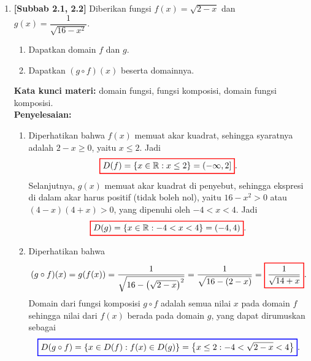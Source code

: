 \documentclass[10pt,openany,a4paper]{article}
\theoremstyle{definition}
\theoremstyle{definition}
\theoremstyle{plain}
\newenvironment{jawab}[2][tes]{%
\par\noindent\textbf{Kata kunci materi:} #1.\\
\textbf{Penyelesaian:} #2%
}{}
\begin{document}
\begin{enumerate}
    \item \textbf{[Subbab 2.1, 2.2]} Diberikan fungsi $f(x)=\sqrt{2-x}$ dan $g(x)=\dfrac{1}{\sqrt{16-x^2}}$.
    \begin{enumerate}
        \item Dapatkan domain $f$ dan $g$.
        \item Dapatkan $(g\circ f)(x)$ beserta domainnya.
    \end{enumerate}
    \begin{jawab}[domain fungsi, fungsi komposisi, domain fungsi komposisi]{
        \begin{enumerate}
            \item Diperhatikan bahwa $f(x)$ memuat akar kuadrat, sehingga syaratnya adalah $2-x\geq 0$, yaitu $x\leq 2$. Jadi
            \begin{align*}
                \colorlet{oldcolor}{.}
        \color{red}
        \setlength{\fboxrule}{1pt} \boxed{\color{oldcolor}D(f)=\{x\in\mathbb{R} : x\leq 2\}=(-\infty,2]}\color{oldcolor}.
            \end{align*}
            Selanjutnya, $g(x)$ memuat akar kuadrat di penyebut, sehingga ekspresi di dalam akar harus positif (tidak boleh nol), yaitu $16-x^2>0$ atau $(4-x)(4+x)>0$, yang dipenuhi oleh $-4<x<4$. Jadi
            \begin{align*}
                \colorlet{oldcolor}{.}
        \color{red}
        \setlength{\fboxrule}{1pt} \boxed{\color{oldcolor}D(g)=\{x\in\mathbb{R} : -4<x<4\}=(-4,4)}\color{oldcolor}.
            \end{align*}
            \item Diperhatikan bahwa
            \begin{align*}
                (g\circ f)(x) = g(f(x)) = \frac{1}{\sqrt{16-\left(\sqrt{2-x}\right)^2}} = \frac{1}{\sqrt{16-(2-x)}} = \colorlet{oldcolor}{.}
        \color{red}
        \setlength{\fboxrule}{1pt} \boxed{\color{oldcolor}\frac{1}{\sqrt{14+x}}}\color{oldcolor}.
            \end{align*}
            Domain dari fungsi komposisi $g\circ f$ adalah semua nilai $x$ pada domain $f$ sehingga nilai dari $f(x)$ berada pada domain $g$, yang dapat dirumuskan sebagai
            \begin{align*}
                \colorlet{oldcolor}{.}
        \color{blue}
        \setlength{\fboxrule}{1pt} \boxed{\color{oldcolor}D(g\circ f) = \{x \in D(f) : f(x) \in D(g)\} = \left\{x \leq 2 : -4<\sqrt{2-x}<4\right\}}\color{oldcolor}.
            \end{align*}

\end{enumerate}}
\end{jawab}
\end{enumerate}
\end{document}
